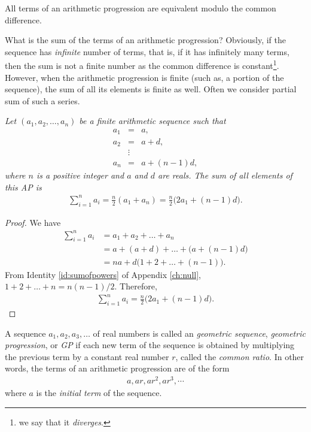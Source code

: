 \documentclass{subfile}
\begin{document}
	\begin{corollary}
		All terms of an arithmetic progression are equivalent modulo the common difference.
	\end{corollary}
What is the sum of the terms of an arithmetic progression? Obviously, if the sequence has \textit{infinite} number of terms, that is, if it has infinitely many terms, then the sum is not a finite number as the common difference is constant\footnote{we say that it \textit{diverges}.}. However, when the arithmetic progression is finite (such as, a portion of the sequence), the sum of all its elements is finite as well. Often we consider partial sum of such a series.
	\begin{theorem}\slshape
		Let $(a_1,a_2,\ldots,a_n)$ be a finite arithmetic sequence such that
			\begin{eqnarray*}
				a_1 & = & a,\\
				a_2 & = & a+d,\\
					& \vdots &\\
				a_n & = & a+ (n-1)d,
			\end{eqnarray*}
		where $n$ is a positive integer and $a$ and $d$ are reals. The sum of all elements of this AP is
			\begin{align*}
				\sum_{i=1}^{n} a_i = \frac{n}{2} \left(a_1+a_n\right) = \frac{n}{2} \big(2a_1 + (n-1)d\big).
			\end{align*}
	\end{theorem}
	
	\begin{proof}
		We have
			\begin{align*}
				\sum_{i=1}^{n} a_i &= a_1 + a_2 + \dots + a_n \\
								   &= a + (a+d) + \dots + \Big(a+ (n-1)d\Big)\\
								   &= na + d\Big(1+2+\dots+ (n-1)\Big).
			\end{align*}
		From Identity \ref{id:sumofpowers} of Appendix \eqref{ch:null}, $1+2+\dots+n = n(n-1)/2$. Therefore,
			\begin{align*}
				\sum_{i=1}^{n} a_i = \frac{n}{2} \big(2a_1 + (n-1)d\big).
			\end{align*}
	\end{proof}
	
	\begin{definition}
		A sequence $a_1, a_2, a_3, \dots$ of real numbers is called an \textit{geometric sequence}, \textit{geometric progression}, or \textit{GP} if each new term of the sequence is obtained by multiplying the previous term by a constant real number $r$, called the \textit{common ratio}. In other words, the terms of an arithmetic progression are of the form
			\begin{align*}
				a, ar, ar^2, ar^3, \cdots
			\end{align*}
		where $a$ is the \textit{initial term} of the sequence.
	\end{definition}
	
\end{document}
